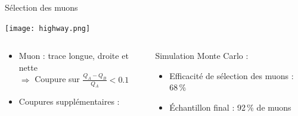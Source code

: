     \begin{frame}{Sélection des muons}
        \begin{scriptsize}
        \texttt{[image: highway.png]}
        \begin{columns}
            \begin{column}{0.5\textwidth}
                \begin{itemize}
                    \item Muon : trace longue, droite et nette \\ $\Rightarrow$ Coupure sur $\frac{Q_A-Q_B}{Q_A} < 0.1$
                    \item Coupures supplémentaires : \begin{itemize}\end{itemize}
                \end{itemize}
            \end{column}
            \begin{column}{0.5\textwidth}
                \hspace{0.3cm} Simulation Monte Carlo :
                \begin{itemize}
                    \item Efficacité de sélection des muons : 68\,\%
                    \item Échantillon final : 92\,\% de muons
                \end{itemize}
            \end{column}
        \end{columns}
        \end{scriptsize}
    \end{frame}
    
